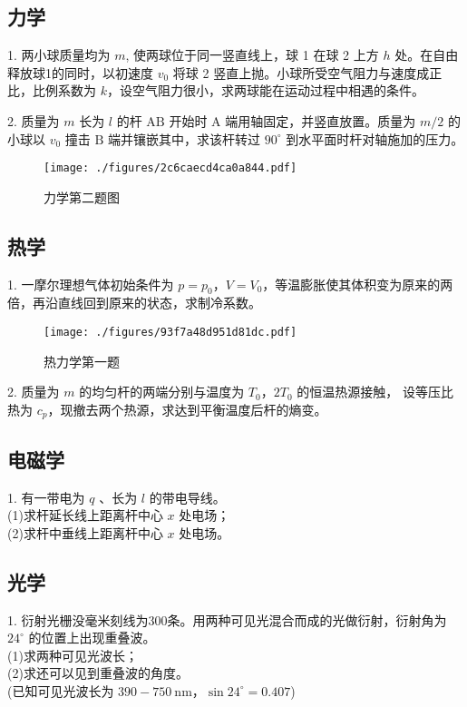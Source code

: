\subsection{力学}
1. 两小球质量均为 $m$, 使两球位于同一竖直线上，球 1 在球 2 上方 $h$ 处。在自由释放球1的同时，以初速度 $v_{0}$ 将球 2 竖直上抛。小球所受空气阻力与速度成正比，比例系数为 $k$，设空气阻力很小，求两球能在运动过程中相遇的条件。

2. 质量为 $m$ 长为 $l$ 的杆 $\mathrm{AB}$ 开始时 $\mathrm{A}$ 端用轴固定，并竖直放置。质量为 $m / 2$ 的小球以 $v_{0}$ 撞击 $\mathrm{B}$ 端并镶嵌其中，求该杆转过 $90^{\circ}$ 到水平面时杆对轴施加的压力。
\begin{figure}[ht]
\centering
\texttt{[image: ./figures/2c6caecd4ca0a844.pdf]}
\caption{力学第二题图} \label{fig_NJU19_1}
\end{figure}
\subsection{热学}
1. 一摩尔理想气体初始条件为 $p=p_{0}$，$V=V_{0}$，等温膨胀使其体积变为原来的两倍，再沿直线回到原来的状态，求制冷系数。
\begin{figure}[ht]
\centering
\texttt{[image: ./figures/93f7a48d951d81dc.pdf]}
\caption{热力学第一题} \label{fig_NJU19_2}
\end{figure}
2. 质量为 $m$ 的均匀杆的两端分别与温度为 $T_{0}$，$2T_{0}$ 的恒温热源接触， 设等压比热为 $c_{p}$，现撤去两个热源，求达到平衡温度后杆的熵变。
\subsection{电磁学}
1. 有一带电为 $q$ 、长为 $l$ 的带电导线。\\
(1)求杆延长线上距离杆中心 $x$ 处电场；\\
(2)求杆中垂线上距离杆中心 $x$ 处电场。
\subsection{光学}
1. 衍射光栅没毫米刻线为300条。用两种可见光混合而成的光做衍射，衍射角为 $24^{\circ}$ 的位置上出现重叠波。\\
(1)求两种可见光波长；\\
(2)求还可以见到重叠波的角度。\\
(已知可见光波长为 $390-750 \mathrm{~nm}$，$\sin 24^{\circ}=0.407$)
